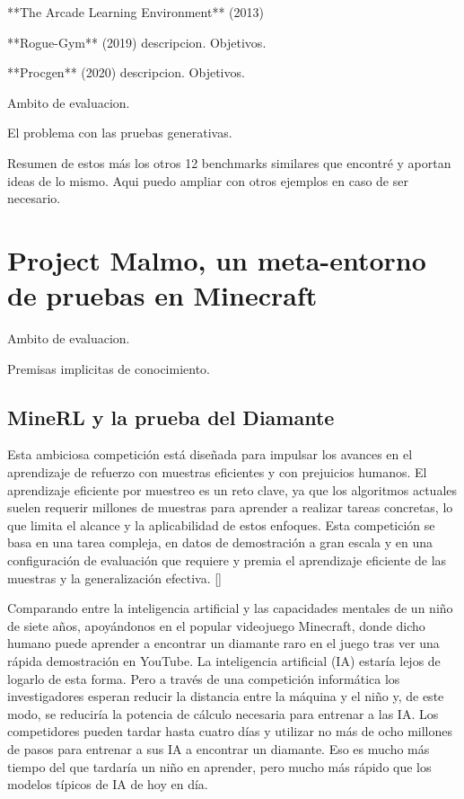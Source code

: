 **The Arcade Learning Environment** (2013)

**Rogue-Gym** (2019) descripcion. Objetivos.

**Procgen** (2020) descripcion. Objetivos.

Ambito de evaluacion.

El problema con las pruebas generativas.

Resumen de estos más los otros 12 benchmarks similares que encontré y aportan ideas de lo mismo. Aqui puedo ampliar con otros ejemplos en caso de ser necesario.

\section{Project Malmo, un meta-entorno de pruebas en Minecraft}\label{section:state-of-the-art:project-malmO}

Ambito de evaluacion.

Premisas implicitas de conocimiento.

\subsection*{MineRL y la prueba del Diamante}

Esta ambiciosa competición está diseñada para impulsar los avances en el aprendizaje de refuerzo con muestras eficientes y con prejuicios humanos. El aprendizaje eficiente por muestreo es un reto clave, ya que los algoritmos actuales suelen requerir millones de muestras para aprender a realizar tareas concretas, lo que limita el alcance y la aplicabilidad de estos enfoques. Esta competición se basa en una tarea compleja, en datos de demostración a gran escala y en una configuración de evaluación que requiere y premia el aprendizaje eficiente de las muestras y la generalización efectiva. [\cite{hofmann2019minecraft}]

Comparando entre la inteligencia artificial y las capacidades mentales de un niño de siete años, apoyándonos en el popular videojuego Minecraft, donde dicho humano puede aprender a encontrar un diamante raro en el juego tras ver una rápida demostración en YouTube. La inteligencia artificial (IA) estaría lejos de logarlo de esta forma. Pero a través de una competición informática los investigadores esperan reducir la distancia entre la máquina y el niño y, de este modo, se reduciría la potencia de cálculo necesaria para entrenar a las IA.
Los competidores pueden tardar hasta cuatro días y utilizar no más de ocho millones de pasos para entrenar a sus IA a encontrar un diamante. Eso es mucho más tiempo del que tardaría un niño en aprender, pero mucho más rápido que los modelos típicos de IA de hoy en día.


